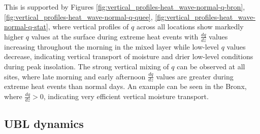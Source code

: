 \documentclass[11pt,a4paper]{article}
\begin{document}
\\ \\
This is supported by Figures \ref{fig:vertical_profiles-heat_wave-normal-q-bron}, \ref{fig:vertical_profiles-heat_wave-normal-q-quee}, \ref{fig:vertical_profiles-heat_wave-normal-q-stat}, where vertical profiles of $q$ across all locations show markedly higher $q$ values at the surface during extreme heat events with $\frac{dq}{dz}$ values increasing throughout the morning in the mixed layer while low-level $q$ values decrease, indicating vertical transport of moisture and drier low-level conditions during peak insolation. The strong vertical mixing of $q$ can be observed at all sites, where late morning and early afternoon $\frac{dq}{dz}$ values are greater during extreme heat events than normal days. An example can be seen in the Bronx, where $\frac{dq}{dz} > 0$, indicating very efficient vertical moisture transport.

\subsection{UBL dynamics}
\end{document}
